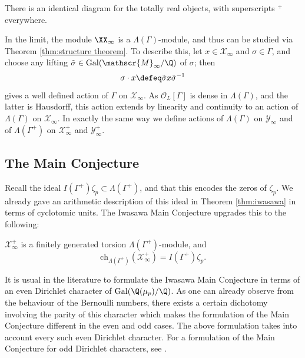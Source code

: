 \documentclass[a4paper,10pt, english, reqno]{smfart}
\newcommand{\GG}{\Gamma}
\numberwithin{equation}{section}
\begin{document}
There is an identical diagram for the totally real objects, with superscripts ${}^+$ everywhere.


\begin{rem}\label{rem:inner automorphisms}
In the limit, the module $\XX_\infty$ is a $\Lambda(\GG)$-module, and thus can be studied via Theorem \ref{thm:structure theorem}. To describe this, let $x \in \mathscr{X}_\infty$ and $\sigma \in \GG$, and choose any lifting $\tilde{\sigma} \in \mathrm{Gal}(\mathscr{M}_\infty / \Q)$ of $\sigma$; then 
\[
	\sigma \cdot x \defeq \tilde{\sigma} x \tilde{\sigma}^{-1}
\]
gives a well defined action of $\GG$ on $\mathscr{X}_\infty$. As $\mathscr{O}_L[\GG]$ is dense in $\Lambda(\GG)$, and the latter is Hausdorff, this action extends by linearity and continuity to an action of $\Lambda(\GG)$ on $\mathscr{X}_\infty$. In exactly the same way we define actions of $\Lambda(\GG)$ on $\mathscr{Y}_\infty$ and of $\Lambda(\GG^+)$ on $\mathscr{X}^+_\infty$ and $\mathscr{Y}^+_\infty$. 
\end{rem}





\subsection{The Main Conjecture}


Recall the ideal $I(\GG^+)\zeta_p \subset \Lambda(\GG^+)$, and that this encodes the zeros of $\zeta_p$. We already gave an arithmetic description of this ideal in Theorem \ref{thm:iwasawa} in terms of cyclotomic units. The Iwasawa Main Conjecture upgrades this to the following:

\begin{theorem}  \label{IMC} $\mathscr{X}^+_\infty$ is a finitely generated torsion $\Lambda(\GG^+)$-module, and 
\[ 
\mathrm{ch}_{\Lambda(\GG^+)}(\mathscr{X}^+_\infty) = I(\GG^+) \zeta_p. 
\]
\end{theorem}


\begin{rem} \leavevmode \label{rem:even v odd}
It is usual in the literature to formulate the Iwasawa Main Conjecture in terms of an even Dirichlet character of $\mathrm{Gal}(\Q(\mu_p) / \Q)$. As one can already observe from the behaviour of the Bernoulli numbers, there exists a certain dichotomy involving the parity of this character which makes the formulation of the Main Conjecture different in the even and odd cases. The above formulation takes into account every such even Dirichlet character. For a formulation of the Main Conjecture for odd Dirichlet characters, see \cite{HK}.
\end{rem}
\end{document}
